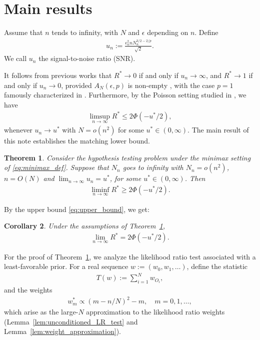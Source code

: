\documentclass[11pt]{article}
\newtheorem{thm}{Theorem}[section]
\newtheorem{cor}[thm]{Corollary}
\numberwithin{equation}{section}
\begin{document}
\section{Main results}
\label{sec:main-results}

Assume that $n$ tends to infinity, with $N$ and $\epsilon$ depending on $n$. 
Define
\begin{align}
    \label{eq:SNR_def}
    u_n := \frac{\epsilon_n^2 n N_n^{3/2-2/p}}{\sqrt{2}}.
\end{align}
We call $u_n$ the signal-to-noise ratio (SNR).

It follows from previous works that $R^* \to 0$ if and only if $u_n \to \infty$, and 
$R^* \to 1$ if and only if $u_n \to 0$, provided $A_{N}(\epsilon,p)$ is non-empty \cite{balakrishnan2019hypothesis,chhor2022sharp}, with the case $p=1$ famously characterized in \cite{paninski2008coincidence}. Furthermore, by the Poisson setting studied in \cite{Kipnis2025minimax}, we have
\begin{align}
\limsup_{n \to \infty} R^* \leq 2 \Phi(-u^*/2),
\label{eq:upper_bound}
\end{align}
whenever $u_n \to u^*$ with $N = o(n^2)$ for some $u^* \in (0,\infty)$. The main result of this note establishes the matching lower bound.

\begin{thm}
\label{thm:main}
    Consider the hypothesis testing problem under the minimax setting of \eqref{eq:minimax_def}. Suppose that $N_n$ goes to infinity with $N_n = o(n^2)$, $n = O(N)$ and $\lim_{n \to \infty} u_n = u^*$, for some $u^* \in (0,\infty)$. Then
    \begin{align*}
        \liminf_{n \to \infty} R^* \geq 2 \Phi(-u^*/2).  
    \end{align*}
\end{thm}

By the upper bound \eqref{eq:upper_bound}, we get:
\begin{cor} 
\label{cor:main}
Under the assumptions of Theorem~\ref{thm:main},
\begin{align}
    \label{eq:minimax_risk_equality}
    \lim_{n \to \infty} R^* = 2 \Phi(-u^*/2).  
\end{align}
\end{cor}

For the proof of Theorem~\ref{thm:main}, we analyze the likelihood ratio test associated with a least-favorable prior. For a real sequence $w := (w_0,w_1,\ldots)$, define the statistic
\begin{align}
    T(w) := \sum_{i=1}^N w_{O_i},
    \label{eq:test_statistic}
\end{align}
and the weights
\begin{align}
    \label{eq:wm_star_equivalent}
    w_m^* \propto (m-n/N)^2 - m,\quad m=0,1,\ldots,
\end{align}
which arise as the large-$N$ approximation to the likelihood ratio weights (Lemma~\ref{lem:unconditioned_LR_test} and Lemma~\ref{lem:weight_approximation}).
\end{document}
